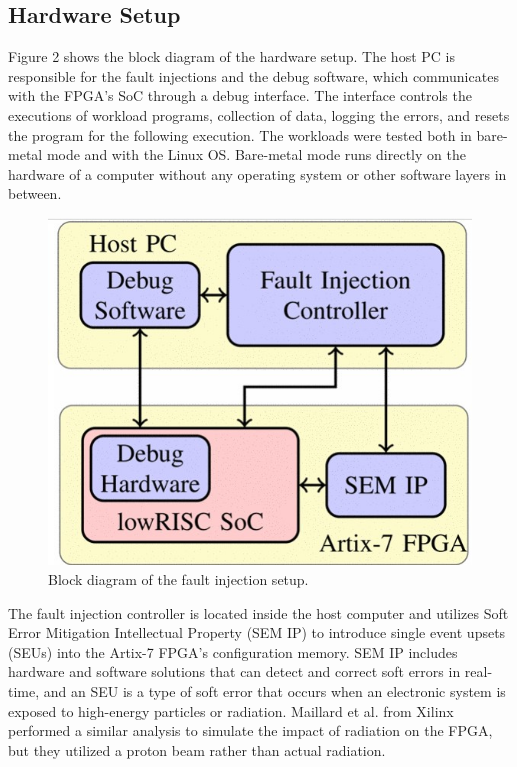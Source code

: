 \documentclass[conference]{IEEEtran}
\begin{document}
\subsection{Hardware Setup}
Figure 2 shows the block diagram of the hardware setup. 
The host PC is responsible for the fault injections and the debug software, which communicates with the FPGA's SoC
through a debug interface. The interface controls the executions of workload programs, collection of data, logging the errors,
and resets the program for the following execution. The workloads were tested both in bare-metal mode and with the Linux OS. 
Bare-metal mode runs directly on the hardware of a computer without any operating system or other software layers in between. 
\begin{figure}[ht]
    \centering
    \includegraphics[scale = 0.5]{fault_inject.jpg}
    \caption{Block diagram of the fault injection setup.}
\end{figure}
The fault injection controller is located inside the host computer and utilizes Soft Error Mitigation Intellectual Property (SEM IP)
to introduce single event upsets (SEUs) into the Artix-7 FPGA's configuration memory. SEM IP includes hardware and software solutions 
that can detect and correct soft errors in real-time, and an SEU is a type of soft error that occurs when an electronic system is 
exposed to high-energy particles or radiation. Maillard et al. from Xilinx performed a similar analysis\cite{b5} to simulate the 
impact of radiation on the FPGA, but they utilized a proton beam rather than actual radiation.
\end{document}
